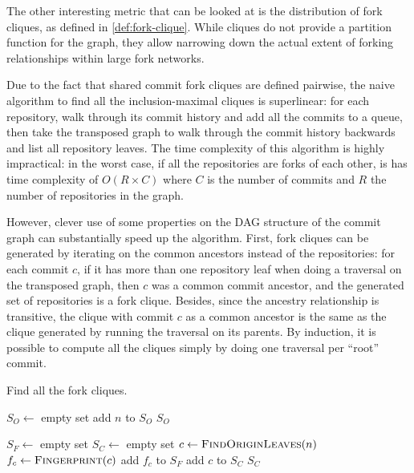 The other interesting metric that can be looked at is the distribution of fork
cliques, as defined in \cref{def:fork-clique}. While cliques do not
provide a partition function for the graph, they allow narrowing down the
actual extent of forking relationships within large fork networks.

Due to the fact that shared commit fork cliques are defined pairwise, the naive
algorithm to find all the inclusion-maximal cliques is superlinear: for each
repository, walk through its commit history and add all the commits to a queue,
then take the transposed graph to walk through the commit history backwards and
list all repository leaves. The time complexity of this algorithm is highly
impractical: in the worst case, if all the repositories are forks of each
other, is has time complexity of $O(R \times C)$ where $C$ is the
number of commits and $R$ the number of repositories in the graph.

However, clever use of some properties on the DAG structure of the commit graph
can substantially speed up the algorithm. First, fork cliques can be generated
by iterating on the common ancestors instead of the repositories: for each
commit $c$, if it has more than one repository leaf when doing a traversal on
the transposed graph, then $c$ was a common commit ancestor, and the generated
set of repositories is a fork clique. Besides, since the ancestry relationship
is transitive, the clique with commit $c$ as a common ancestor is the same as
the clique generated by running the traversal on its parents. By induction, it
is possible to compute all the cliques simply by doing one traversal per
``root'' commit.

\begin{algorithm}[t]
  \caption{Find all the fork cliques.}%
  \label{algo:fork-clique}
  \begin{algorithmic}
    \State $S_O \gets$ empty set
            \State add $n$ to $S_O$
        \EndIf
    \EndFor
    \State \Return $S_O$
\EndFunction

    \State $S_F \gets$ empty set
    \State $S_C \gets$ empty set
            \State $c \gets \Call{FindOriginLeaves}{n}$
            \State $f_c \gets \Call{Fingerprint}{c}$
                \State add $f_c$ to $S_F$
                \State add $c$ to $S_C$
            \EndIf
        \EndIf
    \EndFor
    \State \Return $S_C$
\EndFunction
\end{algorithmic}
\end{algorithm}

